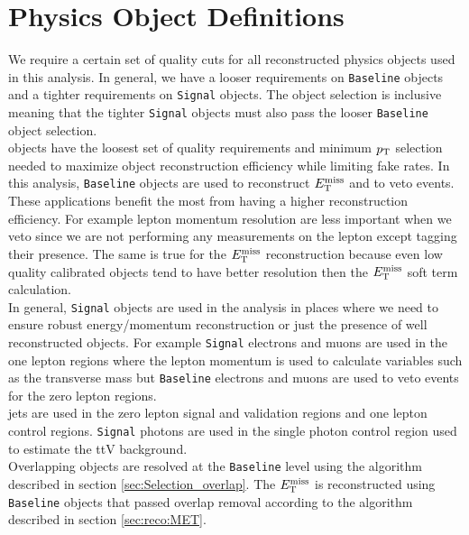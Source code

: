 \chapter{Physics Object Definitions}
\label{chap:objects}

\indent We require a certain set of quality cuts for all reconstructed physics objects used in this analysis.  In general, we have a looser requirements on {\tt Baseline} objects and a tighter requirements on {\tt Signal} objects.  The object selection is inclusive meaning that the tighter {\tt Signal} objects must also pass the looser {\tt Baseline} object selection.  \\

 objects have the loosest set of quality requirements and minimum $p_{\mathrm{T}}$ selection needed to maximize object reconstruction efficiency while limiting fake rates.  In this analysis, {\tt Baseline} objects are used to reconstruct $E_{\mathrm{T}}^{\mathrm{miss}}$ and to veto events.  These applications benefit the most from having a higher reconstruction efficiency.  For example lepton momentum resolution are less important when we veto since we are not performing any measurements on the lepton except tagging their presence.  The same is true for the $E_{\mathrm{T}}^{\mathrm{miss}}$ reconstruction because even low quality calibrated objects tend to have better resolution then the $E_{\mathrm{T}}^{\mathrm{miss}}$ soft term calculation.  \\

\indent In general, {\tt Signal} objects are used in the analysis in places where we need to ensure robust energy/momentum reconstruction or just the presence of well reconstructed objects.  For example {\tt Signal} electrons and muons are used in the one lepton regions where the lepton momentum is used to calculate variables such as the transverse mass but {\tt Baseline} electrons and muons are used to veto events for the zero lepton regions. \\

 jets are used in the zero lepton signal and validation regions and one lepton control regions.  {\tt Signal} photons are used in the single photon control region used to estimate the ttV background. \\

\indent Overlapping objects are resolved at the {\tt Baseline} level using the algorithm described in section \ref{sec:Selection_overlap}.  The $E_{\mathrm{T}}^{\mathrm{miss}}$ is reconstructed using {\tt Baseline} objects that passed overlap removal according to the algorithm described in section \ref{sec:reco:MET}. \\

